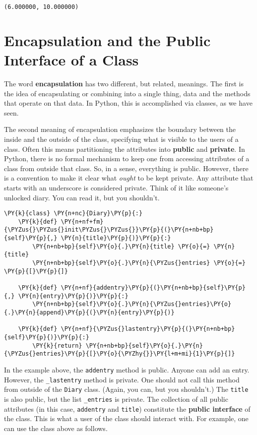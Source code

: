 \begin{Verbatim}
(6.000000, 10.000000)

\end{Verbatim}

\section{Encapsulation and the Public Interface of a Class}


The word \textbf{encapsulation} has two different, but related, meanings.  The first is the idea of encapsulating or combining into a single thing, data and the methods that operate on that data.  In Python, this is accomplished via classes, as we have seen.  


The second meaning of encapsulation emphasizes the boundary between the inside and the outside of the class, specifying what is visible to the users of a class.  Often this means partitioning the attributes into \textbf{public} and \textbf{private}.  In Python, there is no formal mechanism to keep one from accessing attributes of a class from outside that class.  So, in a sense, everything is public.  However, there is a convention to make it clear what \emph{ought} to be kept private.  Any attribute that starts with an underscore is considered private.  Think of it like someone’s unlocked diary.  You can read it, but you shouldn’t.

\begin{Verbatim}[commandchars=\\\{\}]
\PY{k}{class} \PY{n+nc}{Diary}\PY{p}{:}
    \PY{k}{def} \PY{n+nf+fm}{\PYZus{}\PYZus{}init\PYZus{}\PYZus{}}\PY{p}{(}\PY{n+nb+bp}{self}\PY{p}{,} \PY{n}{title}\PY{p}{)}\PY{p}{:}
        \PY{n+nb+bp}{self}\PY{o}{.}\PY{n}{title} \PY{o}{=} \PY{n}{title}
        \PY{n+nb+bp}{self}\PY{o}{.}\PY{n}{\PYZus{}entries} \PY{o}{=} \PY{p}{[}\PY{p}{]}

    \PY{k}{def} \PY{n+nf}{addentry}\PY{p}{(}\PY{n+nb+bp}{self}\PY{p}{,} \PY{n}{entry}\PY{p}{)}\PY{p}{:}
        \PY{n+nb+bp}{self}\PY{o}{.}\PY{n}{\PYZus{}entries}\PY{o}{.}\PY{n}{append}\PY{p}{(}\PY{n}{entry}\PY{p}{)}

    \PY{k}{def} \PY{n+nf}{\PYZus{}lastentry}\PY{p}{(}\PY{n+nb+bp}{self}\PY{p}{)}\PY{p}{:}
        \PY{k}{return} \PY{n+nb+bp}{self}\PY{o}{.}\PY{n}{\PYZus{}entries}\PY{p}{[}\PY{o}{\PYZhy{}}\PY{l+m+mi}{1}\PY{p}{]}
\end{Verbatim}



In the example above, the \texttt{addentry} method is public.  Anyone can add an entry.  However, the \texttt{\_lastentry} method is private.  One should not call this method from outside of the \texttt{Diary} class. (Again, you can, but you shouldn’t.)  The \texttt{title} is also public, but the list \texttt{\_entries} is private.  The collection of all public attributes (in this case, \texttt{addentry} and \texttt{title}) constitute the \textbf{public interface} of the class.  This is what a user of the class should interact with.  For example, one can use the class above as follows.


